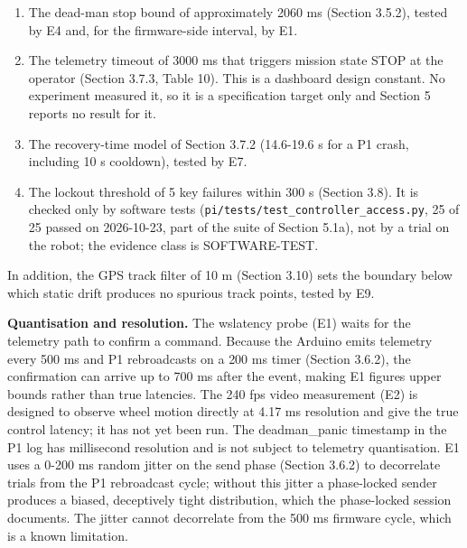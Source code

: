 \begin{enumerate}
\item The dead-man stop bound of approximately 2060 ms (Section 3.5.2), tested by E4 and, for the firmware-side interval, by E1.
\item The telemetry timeout of 3000 ms that triggers mission state STOP at the operator (Section 3.7.3, Table 10). This is a dashboard design constant. No experiment measured it, so it is a specification target only and Section 5 reports no result for it.
\item The recovery-time model of Section 3.7.2 (14.6-19.6 s for a P1 crash, including 10 s cooldown), tested by E7.
\item The lockout threshold of 5 key failures within 300 s (Section 3.8). It is checked only by software tests (\texttt{pi/tests/test\_controller\_access.py}, 25 of 25 passed on 2026-10-23, part of the suite of Section 5.1a), not by a trial on the robot; the evidence class is SOFTWARE-TEST.
\end{enumerate}

In addition, the GPS track filter of 10 m (Section 3.10) sets the boundary below which static drift produces no spurious track points, tested by E9.

\textbf{Quantisation and resolution.} The wslatency probe (E1) waits for the telemetry path to confirm a command. Because the Arduino emits telemetry every 500 ms and P1 rebroadcasts on a 200 ms timer (Section 3.6.2), the confirmation can arrive up to 700 ms after the event, making E1 figures upper bounds rather than true latencies. The 240 fps video measurement (E2) is designed to observe wheel motion directly at 4.17 ms resolution and give the true control latency; it has not yet been run. The deadman\_panic timestamp in the P1 log has millisecond resolution and is not subject to telemetry quantisation. E1 uses a 0-200 ms random jitter on the send phase (Section 3.6.2) to decorrelate trials from the P1 rebroadcast cycle; without this jitter a phase-locked sender produces a biased, deceptively tight distribution, which the phase-locked session documents. The jitter cannot decorrelate from the 500 ms firmware cycle, which is a known limitation.

